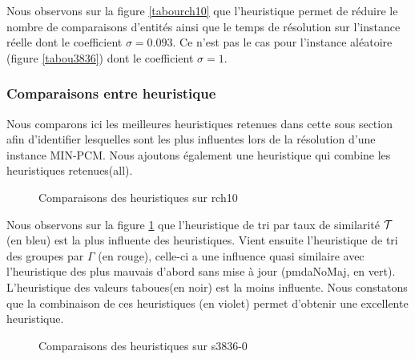 Nous observons sur la figure \ref{tabourch10} que l'heuristique permet de réduire le nombre de comparaisons d'entités ainsi que le temps de résolution sur l'instance réelle dont le coefficient $\sigma = 0.093$. Ce n'est pas le cas pour l'instance aléatoire (figure \ref{tabou3836}) dont le coefficient $\sigma = 1$.

\subsubsection{Comparaisons entre heuristique}
\label{sectCompar}

Nous comparons ici les meilleures heuristiques retenues dans cette sous section afin d'identifier lesquelles sont les plus influentes lors de la résolution d'une instance MIN-PCM. Nous ajoutons également une heuristique qui combine les heuristiques retenues(all).

\begin{figure}
\centering
	\begin{minipage}[c]{0.49\linewidth}
	\centering
	
	\end{minipage}
	\begin{minipage}[c]{0.49\linewidth}
	\centering
	
	\end{minipage}
\caption{Comparaisons des heuristiques sur rch10}
\label{compareRch10}
\end{figure}

Nous observons sur la figure \ref{compareRch10} que l'heuristique de tri par taux de similarité $\cal{T}$ (en bleu) est la plus influente des heuristiques. Vient ensuite l'heuristique de tri des groupes par $\Gamma$ (en rouge), celle-ci a une influence quasi similaire avec l'heuristique des plus mauvais d'abord sans mise à jour (pmdaNoMaj, en vert). L'heuristique des valeurs taboues(en noir) est la moins influente. Nous constatons que la combinaison de ces heuristiques (en violet) permet d'obtenir une excellente heuristique.

\begin{figure}
\centering
	\begin{minipage}[c]{0.49\linewidth}
	\centering
	
	\end{minipage}
	\begin{minipage}[c]{0.49\linewidth}
	\centering
	
	\end{minipage}
\caption{Comparaisons des heuristiques sur s3836-0}
\label{compares3836}
\end{figure}


